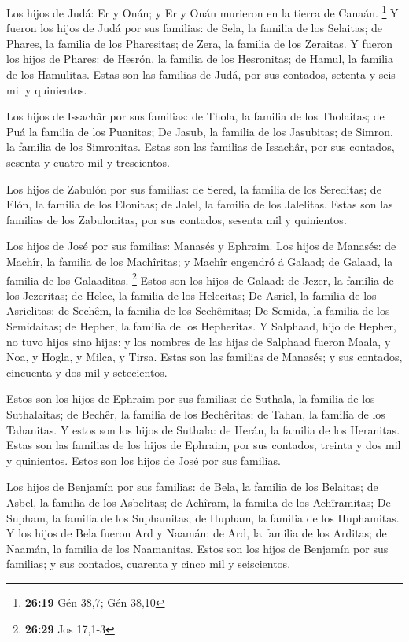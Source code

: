  Los hijos de Judá: Er y Onán; y Er y Onán murieron en la
tierra de Canaán. \footnote{\textbf{26:19} Gén 38,7; Gén 38,10}
 Y fueron los hijos de Judá por sus familias: de Sela, la
familia de los Selaitas; de Phares, la familia de los Pharesitas; de
Zera, la familia de los Zeraitas.  Y fueron los hijos de
Phares: de Hesrón, la familia de los Hesronitas; de Hamul, la familia de
los Hamulitas.  Estas son las familias de Judá, por sus
contados, setenta y seis mil y quinientos.

 Los hijos de Issachâr por sus familias: de Thola, la
familia de los Tholaitas; de Puá la familia de los Puanitas;
 De Jasub, la familia de los Jasubitas; de Simron, la
familia de los Simronitas.  Estas son las familias de
Issachâr, por sus contados, sesenta y cuatro mil y trescientos.

 Los hijos de Zabulón por sus familias: de Sered, la
familia de los Sereditas; de Elón, la familia de los Elonitas; de Jalel,
la familia de los Jalelitas.  Estas son las familias de los
Zabulonitas, por sus contados, sesenta mil y quinientos.

 Los hijos de José por sus familias: Manasés y Ephraim.
 Los hijos de Manasés: de Machîr, la familia de los
Machîritas; y Machîr engendró á Galaad; de Galaad, la familia de los
Galaaditas. \footnote{\textbf{26:29} Jos 17,1-3}  Estos son
los hijos de Galaad: de Jezer, la familia de los Jezeritas; de Helec, la
familia de los Helecitas;  De Asriel, la familia de los
Asrielitas: de Sechêm, la familia de los Sechêmitas;  De
Semida, la familia de los Semidaitas; de Hepher, la familia de los
Hepheritas.  Y Salphaad, hijo de Hepher, no tuvo hijos sino
hijas: y los nombres de las hijas de Salphaad fueron Maala, y Noa, y
Hogla, y Milca, y Tirsa.  Estas son las familias de
Manasés; y sus contados, cincuenta y dos mil y setecientos.

 Estos son los hijos de Ephraim por sus familias: de
Suthala, la familia de los Suthalaitas; de Bechêr, la familia de los
Bechêritas; de Tahan, la familia de los Tahanitas.  Y estos
son los hijos de Suthala: de Herán, la familia de los Heranitas.
 Estas son las familias de los hijos de Ephraim, por sus
contados, treinta y dos mil y quinientos. Estos son los hijos de José
por sus familias.

 Los hijos de Benjamín por sus familias: de Bela, la
familia de los Belaitas; de Asbel, la familia de los Asbelitas; de
Achîram, la familia de los Achîramitas;  De Supham, la
familia de los Suphamitas; de Hupham, la familia de los Huphamitas.
 Y los hijos de Bela fueron Ard y Naamán: de Ard, la
familia de los Arditas; de Naamán, la familia de los Naamanitas.
 Estos son los hijos de Benjamín por sus familias; y sus
contados, cuarenta y cinco mil y seiscientos.

